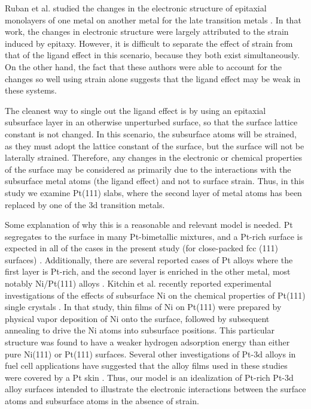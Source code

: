 \documentclass[aps,preprint,superscriptaddress,endfloats*]{revtex4}
\begin{document}
Ruban et al. studied the changes in the electronic structure of
epitaxial monolayers of one metal on another metal for the late
transition metals \cite{ruban1997:_surfac}.  In that work, the changes
in electronic structure were largely attributed to the strain induced
by epitaxy.  However, it is difficult to separate the effect of strain
from that of the ligand effect in this scenario, because they both
exist simultaneously.  On the other hand, the fact that these authors
were able to account for the changes so well using strain alone
suggests that the ligand effect may be weak in these systems.

The cleanest way to single out the ligand effect is by using an
epitaxial subsurface layer in an otherwise unperturbed surface, so
that the surface lattice constant is not changed.  In this scenario,
the subsurface atoms will be strained, as they must adopt the lattice
constant of the surface, but the surface will not be laterally
strained.  Therefore, any changes in the electronic or chemical
properties of the surface may be considered as primarily due to the
interactions with the subsurface metal atoms (the ligand effect) and
not to surface strain.  Thus, in this study we examine Pt(111) slabs,
where the second layer of metal atoms has been replaced by one of the
3d transition metals.

Some explanation of why this is a reasonable and relevant model is
needed.  Pt segregates to the surface in many Pt-bimetallic mixtures,
and a Pt-rich surface is expected in all of the cases in the present
study (for close-packed fcc (111) surfaces) \cite{ruban1999}.
Additionally, there are several reported cases of Pt alloys where the
first layer is Pt-rich, and the second layer is enriched in the other
metal, most notably Ni/Pt(111) alloys \cite{gauthier1985}.  Kitchin et
al. recently reported experimental investigations of the effects of
subsurface Ni on the chemical properties of Pt(111) single crystals
\cite{kitchin2003:_elucid_ni_pt}. In that study, thin films of Ni on
Pt(111) were prepared by physical vapor deposition of Ni onto the
surface, followed by subsequent annealing to drive the Ni atoms into
subsurface positions.  This particular structure was found to have a
weaker hydrogen adsorption energy than either pure Ni(111) or Pt(111)
surfaces.  Several other investigations of Pt-3d alloys in fuel cell
applications have suggested that the alloy films used in these studies
were covered by a Pt skin \cite{toda1999,watanabe2000,wan2002}. Thus,
our model is an idealization of Pt-rich Pt-3d alloy surfaces intended to
illustrate the electronic interactions between the surface atoms and
subsurface atoms in the absence of strain.
\end{document}
